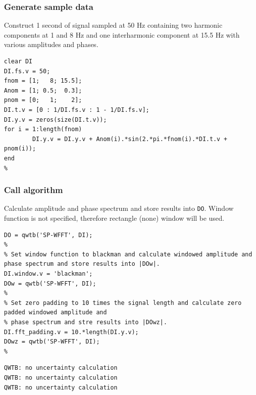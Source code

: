 \startcontents[localtoc]



{}
\subsubsection*{Generate sample data}



Construct 1 second of signal sampled at 50 Hz containing
two harmonic components at 1 and 8 Hz and one interharmonic
component at 15.5 Hz with various amplitudes and phases.

\begin{lstlisting}
clear DI
DI.fs.v = 50;
fnom = [1;   8; 15.5];
Anom = [1; 0.5;  0.3];
pnom = [0;   1;    2];
DI.t.v = [0 : 1/DI.fs.v : 1 - 1/DI.fs.v];
DI.y.v = zeros(size(DI.t.v));
for i = 1:length(fnom)
        DI.y.v = DI.y.v + Anom(i).*sin(2.*pi.*fnom(i).*DI.t.v + pnom(i));
end
%
\end{lstlisting}


{}
\subsubsection*{Call algorithm}



Calculate amplitude and phase spectrum and store results into \texttt{DO}. Window function is not specified, therefore rectangle (none) window will be used.

\begin{lstlisting}
DO = qwtb('SP-WFFT', DI);
%
% Set window function to blackman and calculate windowed amplitude and phase spectrum and store results into |DOw|.
DI.window.v = 'blackman';
DOw = qwtb('SP-WFFT', DI);
%
% Set zero padding to 10 times the signal length and calculate zero padded windowed amplitude and
% phase spectrum and stre results into |DOwz|.
DI.fft_padding.v = 10.*length(DI.y.v);
DOwz = qwtb('SP-WFFT', DI);
%
\end{lstlisting}
\begin{lstlisting}[language={},xleftmargin=5pt,frame=none]
QWTB: no uncertainty calculation
QWTB: no uncertainty calculation
QWTB: no uncertainty calculation

\end{lstlisting}


